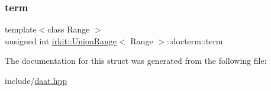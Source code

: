 \subsubsection{\texorpdfstring{term}{term}}
{\footnotesize\ttfamily template$<$class Range $>$ \\
unsigned int \hyperlink{classirkit_1_1UnionRange}{irkit\+::\+Union\+Range}$<$ Range $>$\+::docterm\+::term}



The documentation for this struct was generated from the following file\+:\begin{DoxyCompactItemize}
\item 
include/\hyperlink{daat_8hpp}{daat.\+hpp}\end{DoxyCompactItemize}
